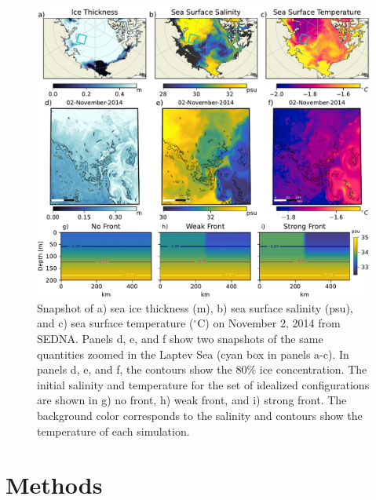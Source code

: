 \documentclass[draft]{agujournal2019}
\begin{document}
\begin{figure}
    \includegraphics[width=1\textwidth]{Fig_1_combined_new.pdf}
    \caption{Snapshot of a) sea ice thickness (m), b) sea surface salinity (psu), and c) sea surface temperature ($^\circ$C) on  November 2, 2014 from SEDNA. Panels d, e, and f show two snapshots of the same quantities zoomed in the Laptev Sea (cyan box in panels a-c). In panels d, e, and f, the contours show the 80\% ice concentration. The initial salinity and temperature for the set of idealized configurations are shown in g) no front, h) weak front, and i) strong front. The background color corresponds to the salinity and contours show the temperature of each simulation. }
    \label{fig:fig1}
\end{figure}

\section{Methods}
\label{sec:Methods}
\end{document}
